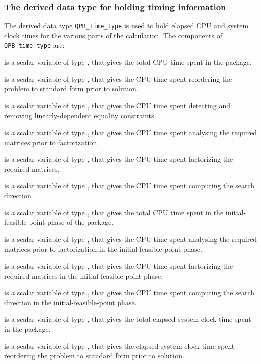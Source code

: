 \documentclass{galahad}
\newcommand{\packagename}{QPB}
\begin{document}
\subsubsection{The derived data type for holding timing 
 information}\label{typetime}
The derived data type 
{\tt \packagename\_time\_type} 
is used to hold elapsed CPU and system clock times for the various parts of 
the calculation. The components of 
{\tt \packagename\_time\_type} 
are:
\begin{description}
 is a scalar variable of type \realdp, that gives
 the total CPU time spent in the package.

 is a scalar variable of type \realdp, that gives
 the CPU time spent reordering the problem to standard form prior to solution.

 is a scalar variable of type \realdp, that gives
 the CPU time spent detecting and removing linearly-dependent equality 
constraints

 is a scalar variable of type \realdp, that gives
 the CPU time spent analysing the required matrices prior to factorization.

 is a scalar variable of type \realdp, that gives
 the CPU time spent factorizing the required matrices.

 is a scalar variable of type \realdp, that gives
 the CPU time spent computing the search direction.

 is a scalar variable of type \realdp, that gives
 the total CPU time spent in the initial-feasible-point phase of the package.

 is a scalar variable of type \realdp, that gives
 the CPU time spent analysing the required matrices prior to factorization
 in the initial-feasible-point phase.

 is a scalar variable of type \realdp, that gives
 the CPU time spent factorizing the required matrices
 in the initial-feasible-point phase.

 is a scalar variable of type \realdp, that gives
 the CPU time spent computing the search direction
 in the initial-feasible-point phase.

 is a scalar variable of type \realdp, that gives
 the total elapsed system clock time spent in the package.

 is a scalar variable of type \realdp, that gives
 the elapsed system clock time spent reordering the problem to standard form 
prior to solution.


\end{description}
\end{document}
